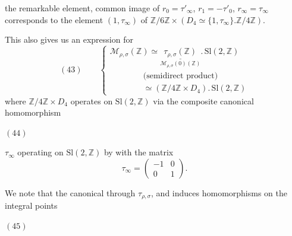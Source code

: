 
the remarkable element, common image of $r_0=\tau'_\infty$, $r_1=-\tau'_0$, $r_\infty=\tau_\infty$ corresponds to the element $(1,\tau_\infty)$ of $\mathbb Z/6\mathbb Z\times(D_4\simeq\{1,\tau_\infty\}.\mathbb Z/4\mathbb Z)$.

This also gives us an expression for 
\[
(43)\qquad
\left\{
\begin{array}{l}
\mathcal M_{\rho,\sigma}(\mathbb Z)\simeq
\underset{\mathcal M_{\rho,\sigma}(0)(\mathbb Z)}{\underline{\tau_{\rho,\sigma}(\mathbb Z)}}
.\,\mathrm{Sl}(2,\mathbb Z)\\[5pt]
\hspace{4em}\text{(semidirect product)}\\[5pt]
\hspace{4em}\simeq(\mathbb Z/4\mathbb Z\times D_4).\,\mathrm{Sl}(2,\mathbb Z)
\end{array}\right.
\]
where $\mathbb Z/4\mathbb Z\times D_4$ operates on $\mathrm{Sl}(2,\mathbb Z)$ via the composite canonical homomorphism

\begin{samepage}
\noindent$(44)$\quad
{}
\end{samepage}

$\tau_\infty$ operating on $\mathrm{Sl}(2,\mathbb Z)$ by  with the matrix
\[
\tau_\infty=\begin{pmatrix}-1&0\\0&1\end{pmatrix}.
\]
\margin{!}

We note that the canonical 
 through  $\tau_{\rho,\sigma}$, and induces homomorphisms on the integral points

\begin{samepage}
\noindent$(45)$\quad
{}
\end{samepage}

